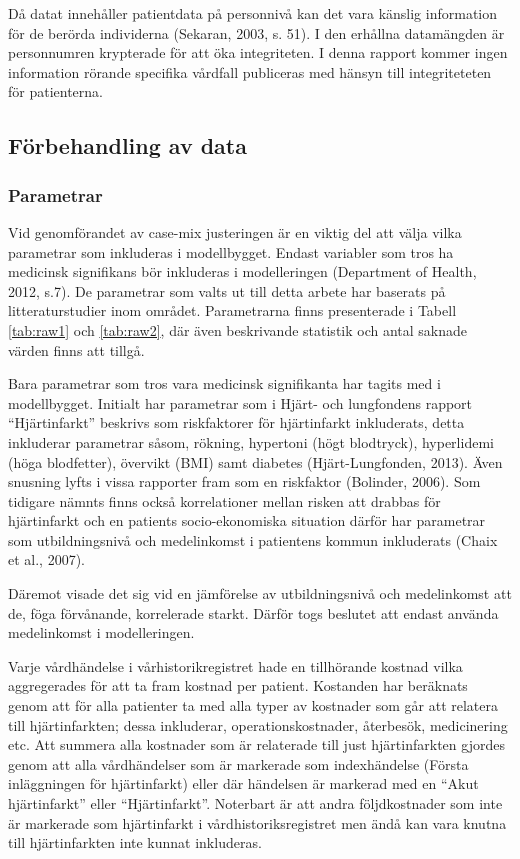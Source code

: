 Då datat innehåller patientdata på personnivå kan det vara känslig information för de berörda individerna (Sekaran, 2003, s. 51). I den erhållna datamängden är personnumren krypterade för att öka integriteten. I denna rapport kommer ingen information rörande specifika vårdfall publiceras med hänsyn till integriteteten för patienterna.

\subsection{Förbehandling av data}

\subsubsection{Parametrar}

Vid genomförandet av case-mix justeringen är en viktig del att välja vilka parametrar som inkluderas i modellbygget. Endast variabler som tros ha medicinsk signifikans bör inkluderas i modelleringen (Department of Health, 2012, s.7). De parametrar som valts ut till detta arbete har baserats på litteraturstudier inom området. Parametrarna finns presenterade i Tabell \ref{tab:raw1} och \ref{tab:raw2}, där även beskrivande statistik och antal saknade värden finns att tillgå.

Bara parametrar som tros vara medicinsk signifikanta har tagits med i modellbygget. Initialt har parametrar som i Hjärt- och lungfondens rapport “Hjärtinfarkt” beskrivs som riskfaktorer för hjärtinfarkt inkluderats, detta inkluderar parametrar såsom, rökning, hypertoni (högt blodtryck), hyperlidemi (höga blodfetter), övervikt (BMI) samt diabetes (Hjärt-Lungfonden, 2013). Även snusning lyfts i vissa rapporter fram som en riskfaktor (Bolinder, 2006). Som tidigare nämnts finns också korrelationer mellan risken att drabbas för hjärtinfarkt och en patients socio-ekonomiska situation därför har parametrar som utbildningsnivå och medelinkomst i patientens kommun inkluderats (Chaix et al., 2007).

Däremot visade det sig vid en jämförelse av utbildningsnivå och medelinkomst att de, föga förvånande, korrelerade starkt. Därför togs beslutet att endast använda medelinkomst i modelleringen.

Varje vårdhändelse i vårhistorikregistret hade en tillhörande kostnad vilka aggregerades för att ta fram kostnad per patient. Kostanden har beräknats genom att för alla patienter ta med alla typer av kostnader som går att relatera till hjärtinfarkten; dessa inkluderar, operationskostnader, återbesök, medicinering etc. Att summera alla kostnader som är relaterade till just hjärtinfarkten gjordes genom att alla vårdhändelser som är markerade som indexhändelse (Första inläggningen för hjärtinfarkt) eller där händelsen är markerad med en “Akut hjärtinfarkt” eller “Hjärtinfarkt”. Noterbart är att andra följdkostnader som inte är markerade som hjärtinfarkt i vårdhistoriksregistret men ändå kan vara knutna till hjärtinfarkten inte kunnat inkluderas.


